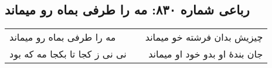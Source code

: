 \begin{center}
\section*{رباعی شماره ۸۳۰: مه را طرفی بماه رو میماند}
\label{sec:0830}
\begin{longtable}{l p{0.5cm} r}
مه را طرفی بماه رو میماند
&&
چیزیش بدان فرشته خو میماند
\\
نی نی ز کجا تا بکجا مه که بود
&&
جان بندهٔ او بدو خود او میماند
\\
\end{longtable}
\end{center}
